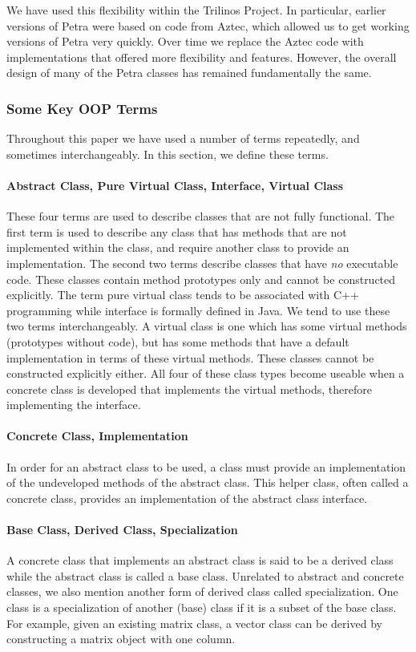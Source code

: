\documentclass[12pt,relax]{SANDreport}
\begin{document}
We have used this flexibility within the Trilinos Project.  In particular, earlier versions
of Petra were based on code from Aztec, which allowed us to get working versions of Petra
very quickly.  Over time we replace the Aztec code with implementations that offered more
flexibility and features.  However, the overall design of many of the Petra classes has
remained fundamentally the same.

\subsubsection{Some Key OOP Terms}
Throughout this paper we have used a number of terms repeatedly, and sometimes interchangeably.
In this section, we define these terms.

\paragraph{Abstract Class, Pure Virtual Class, Interface, Virtual Class}  
These four terms are used to describe
classes that are not fully functional.  The first term is used to describe any class that has
methods that are not implemented within the class, and require another class to provide an
implementation.  The second two terms describe classes that have 
{\it no} executable code.  These classes contain method prototypes only and cannot be constructed
explicitly.  The term pure virtual class tends to be associated with C++ programming
while interface is formally defined in Java.  We tend to use these two terms interchangeably.  A
virtual class is one which has some virtual methods (prototypes without code), but has some methods
that have a default implementation in terms of these virtual methods.  These classes cannot be
constructed explicitly either.  All four of these class types become useable when a concrete class
is developed that implements the virtual methods, therefore implementing the interface.

\paragraph{Concrete Class, Implementation}  In order for an 
abstract class to be
used, a class must provide an implementation of the undeveloped methods of the abstract class.
This helper class, often called a concrete class, provides an implementation of the abstract 
class interface.  

\paragraph{Base Class, Derived Class, Specialization} 
A concrete class that implements an abstract class is said to be a derived class while the
abstract class is called a base class.  Unrelated to abstract and concrete classes, we also
mention another form of derived class called specialization.  One class is a specialization of
another (base) class if it is a subset of the base class.  For example, given an existing
matrix class, a vector class can be derived by constructing a matrix object with one column.
\end{document}
